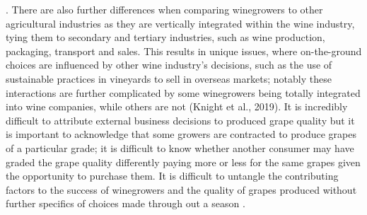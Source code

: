 \documentclass[review,12pt,authoryear]{elsarticle}
\begin{document}
\begin{linenumbers}
%
%
%
%

 . There are also further differences when comparing winegrowers to other agricultural industries as they are vertically integrated within the wine industry, tying them to secondary and tertiary industries, such as wine production, packaging, transport and sales. This results in unique issues, where on-the-ground choices are influenced by other wine industry's decisions, such as the use of sustainable practices in vineyards to sell in overseas markets; notably these interactions are further complicated by some winegrowers being totally integrated into wine companies, while others are not (Knight et al., 2019). 
 It is incredibly difficult to attribute external business decisions to produced grape quality but it is important to acknowledge that some growers are contracted to produce grapes of a particular grade; it is difficult to know whether another consumer may have graded the grape quality differently paying more or less for the same grapes given the opportunity to purchase them.
 It is difficult to untangle the contributing factors to the success of winegrowers and the quality of grapes produced without further specifics of choices made through out a season \citep{leileiheFruitYieldPrediction2022}.


\end{linenumbers}
\end{document}
